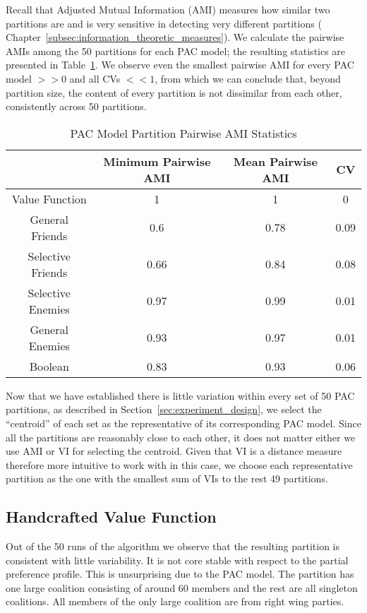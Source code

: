 Recall that Adjusted Mutual Information (AMI) measures how similar two
partitions are and is very sensitive in detecting very different partitions (
Chapter~\ref{subsec:information_theoretic_measures}).
We calculate the pairwise AMIs among the 50 partitions for each PAC model;
the resulting statistics are presented in
Table~\ref{analysis:table:pac_pairwise_amis}.
We observe even the smallest pairwise AMI for every PAC model $>> 0$ and all CVs
$<< 1$, from which we can conclude that, beyond partition size, the content
of every partition is not dissimilar from each other, consistently across 50
partitions.

\begin{table}[h!]
\centering
\begin{tabular}{|c|c|c|c|}
\hline
       & Minimum Pairwise AMI & Mean Pairwise AMI & CV \\ \hline
Value Function & 1 & 1 & 0 \\
General Friends & 0.6 & 0.78 & 0.09  \\
Selective Friends & 0.66 & 0.84 & 0.08  \\
Selective Enemies & 0.97 & 0.99 & 0.01 \\
General Enemies & 0.93 & 0.97 & 0.01 \\
Boolean & 0.83 & 0.93 & 0.06  \\
\hline
\end{tabular}
\caption{PAC Model Partition Pairwise AMI Statistics}
\label{analysis:table:pac_pairwise_amis}
\end{table}

Now that we have established there is little variation within every set of 50
PAC partitions, as described in Section~\ref{sec:experiment_design}, we select
the ``centroid'' of each set as the representative of its corresponding PAC model.
Since all the partitions are reasonably close to each other, it does not
matter either we use AMI or VI for selecting the centroid.
Given that VI is a distance measure therefore more intuitive to work with in
this case, we choose each representative partition as the one with the smallest
sum of VIs to the rest 49 partitions.


\subsection{Handcrafted Value Function}

Out of the 50 runs of the algorithm we observe that the resulting partition
is consistent with little variability.
It is not core stable with respect to the partial preference profile.
This is unsurprising due to the PAC model.
The partition has one large coalition consisting of around 60 members
and the rest are all singleton coalitions.
All members of the only large coalition are from right wing parties.

